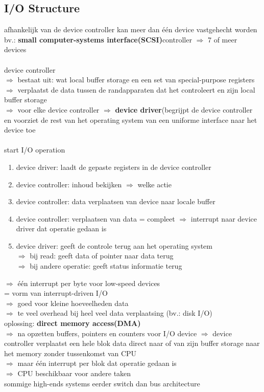 \documentclass{report}
\begin{document}
\subsection{I/O Structure}
afhankelijk van de device controller kan meer dan \'e\'en device vastgehecht worden
\\bv.: \textbf{small computer-systems interface(SCSI)}controller $\Rightarrow$ 7 of meer devices
\\
\\device controller
\\$\Rightarrow$ bestaat uit: wat local buffer storage en een set van special-purpose registers
\\$\Rightarrow$ verplaatst de data tussen de randapparaten dat het controleert en zijn local buffer storage
\\$\Rightarrow$ voor elke device controller $\Rightarrow$ \textbf{device driver}(begrijpt de device controller en voorziet de rest van het operating system van een uniforme interface naar het device toe
\\
\\start I/O operation
\begin{enumerate}
\item device driver: laadt de gepaste registers in de device controller
\item device controller: inhoud bekijken $\Rightarrow$ welke actie 
\item device controller: data verplaatsen van device naar locale buffer
\item device controller: verplaatsen van data = compleet $\Rightarrow$ interrupt naar device driver dat operatie gedaan is
\item device driver: geeft de controle terug aan het operating system 
\\$\Rightarrow$ bij read: geeft data of pointer naar data terug
\\$\Rightarrow$ bij andere operatie: geeft status informatie terug
\end{enumerate}
$\Rightarrow$ \'e\'en interrupt per byte voor low-speed devices
\\= vorm van interrupt-driven I/O 
\\$\Rightarrow$ goed voor kleine hoeveelheden data
\\$\Rightarrow$ te veel overhead bij heel veel data verplaatsing (bv.: disk I/O)
\\ oplossing: \textbf{direct memory access(DMA)}
\\$\Rightarrow$ na opzetten buffers, pointers en counters voor I/O device $\Rightarrow$ device controller verplaatst een hele blok data direct naar of van zijn buffer storage naar het memory zonder tussenkomst van CPU
\\$\Rightarrow$ maar \'e\'en interrupt per blok dat operatie gedaan is
\\$\Rightarrow$ CPU beschikbaar voor andere taken
\\sommige high-ends systems eerder switch dan bus architecture
\end{document}
